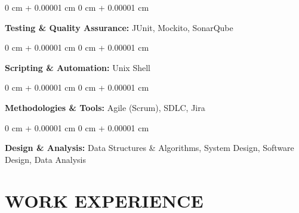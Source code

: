 \documentclass[10pt, letterpaper]{article}
\newenvironment{onecolentry}{
    \begin{adjustwidth}{
        0 cm + 0.00001 cm
    }{
        0 cm + 0.00001 cm
    }
}{
    \end{adjustwidth}
} %
\begin{document}
        \vspace{0.1 cm}
        \begin{onecolentry}
        \textbf{Testing \& Quality Assurance:}  JUnit, Mockito, SonarQube
        \end{onecolentry}
        \vspace{0.1 cm}
        \begin{onecolentry}
        \textbf{Scripting \& Automation:}  Unix Shell
        \end{onecolentry}
        \begin{onecolentry}
        \textbf{Methodologies \& Tools:}  Agile (Scrum), SDLC, Jira
        \end{onecolentry}
        \vspace{0.1 cm}
        \begin{onecolentry}
        \textbf{Design \& Analysis:} Data Structures \& Algorithms, System Design, Software Design, Data Analysis
        \end{onecolentry}

        
    \vspace{0.1 cm}    
    \section{WORK EXPERIENCE}
    \vspace{0.1 cm}
        
\end{document}
